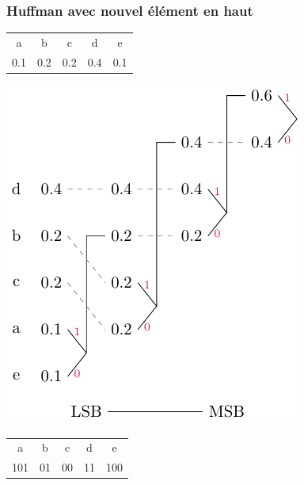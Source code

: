 \documentclass[resume]{subfiles}
\begin{document}
\subsubsection{Huffman avec nouvel élément en haut}
\begin{center}
\begin{tabular}{ccccc}
a & b & c & d & e\\
0.1 & 0.2 & 0.2 & 0.4 & 0.1
\end{tabular}
\end{center}
\begin{center}
\includegraphics[scale=0.75,page=1]{drwg_4.pdf}
\\
\begin{tabular}{ccccc}
a & b & c & d & e\\
101 & 01 & 00 & 11 & 100
\end{tabular}
\end{center}
\end{document}
